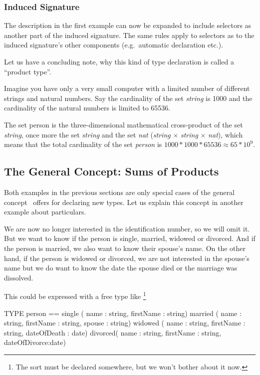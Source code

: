 \subsubsection{Induced Signature}
\advanced
The description in the first example can now be expanded to include
selectors as another part of the induced signature.
The same rules apply to selectors as to the induced signature's
other components
 (e.g.~automatic declaration etc.).

\experienced Let us have a concluding note, why this kind of type
declaration is called a ``product type''.

Imagine you have only a very small computer with a limited number of
different strings and natural numbers.
Say the cardinality of the set  {\em string\/} is 1000 and the cardinality
of the natural numbers is limited to 65536.

The set person is the three-dimensional mathematical cross-product of
the set {\em string\/}, once more the set {\em string\/} and the set
{\em nat\/} 
 ({\em string\/} $\times$ {\em string} $\times$ {\em nat\/}), 
which means that the total cardinality of the 
set {\em person} is $1000 * 1000 * 65536 \approx 65*10^9$.  


\subsection{The General Concept: Sums of Products}
\advanced
Both  examples in the previous sections are only special cases of the general
concept \opal\ offers for declaring new types. Let us explain this
concept in another example about particulars. 

We are now no longer interested in the identification number, so we
will omit it.
But we want to  know if the person is single, married, widowed or
divorced. 
And if the person is married, we also want to know their
spouse's name.
On the other hand, if the person is  widowed or divorced, we are not
interested 
in the spouse's name but we  do want to know the date the spouse
died or the marriage was dissolved.

This could be expressed with  a free type like%
\footnote{The sort  must be declared somewhere, but we won't
  bother about it now.} 
\begin{prog}
        TYPE person == single  ( name : string, firstName : string)
                       married ( name : string, firstName : string,
                                 spouse : string)
                       widowed ( name : string, firstName : string,
                                 dateOfDeath : date)
                       divorced( name : string, firstName : string,
                                 dateOfDivorce:date)
\end{prog}

